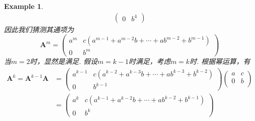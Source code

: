 \documentclass{article}
\newtheorem{example}[theorem]{Example}
\newcommand{\mbf}[1]{\bm{#1}}
\begin{document}
\begin{example}
$$\begin{array}{ll}
\begin{pmatrix}
0 & b^4  
\end{pmatrix}
\end{array} 
$$
因此我们猜测其通项为
$$
\mbf{A}^m = \begin{pmatrix}
a^m & c(a^{m-1} + a^{m-2}b + \cdots + ab^{m-2}+b^{m-1}) \\
0 & b^m
\end{pmatrix}
$$
当$m = 2$时，显然是满足. 假设$m = k-1$时满足，考虑$m = k$时. 根据幂运算，有
$$
\begin{array}{ll}
\mbf{A}^k = \mbf{A}^{k-1} \mbf{A} &= \begin{pmatrix}
a^{k-1} & c(a^{k-2} + a^{k-3}b + \cdots + ab^{k-3}+b^{k-2}) \\
0 & b^{k-1}
\end{pmatrix}\begin{pmatrix}
a & c \\
0 & b\\
\end{pmatrix} \\
&= \begin{pmatrix}
a^{k} & c(a^{k-1} + a^{k-2}b + \cdots + ab^{k-2}+b^{k-1}) \\
0 & b^{k}
\end{pmatrix}
\end{array}
$$
\end{example}
\end{document}
